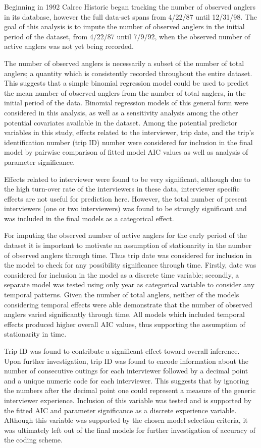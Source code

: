 \documentclass[12pt,]{article}
\begin{document}
Beginning in 1992 Calrec Historic began tracking the number of observed
anglers in its database, however the full data-set spans from 4/22/87
until 12/31/98. The goal of this analysis is to impute the number of
observed anglers in the initial period of the dataset, from 4/22/87
until 7/9/92, when the observed number of active anglers was not yet
being recorded.

The number of observed anglers is necessarily a subset of the number of
total anglers; a quantity which is consistently recorded throughout the
entire dataset. This suggests that a simple binomial regression model
could be used to predict the mean number of observed anglers from the
number of total anglers, in the initial period of the data. Binomial
regression models of this general form were considered in this analysis,
as well as a sensitivity analysis among the other potential covariates
available in the dataset. Among the potential predictor variables in
this study, effects related to the interviewer, trip date, and the
trip's identification number (trip ID) number were considered for
inclusion in the final model by pairwise comparison of fitted model AIC
values as well as analysis of parameter significance.

Effects related to interviewer were found to be very significant,
although due to the high turn-over rate of the interviewers in these
data, interviewer specific effects are not useful for prediction here.
However, the total number of present interviewers (one or two
interviewers) was found to be strongly significant and was included in
the final models as a categorical effect.

For imputing the observed number of active anglers for the early period
of the dataset it is important to motivate an assumption of stationarity
in the number of observed anglers through time. Thus trip date was
considered for inclusion in the model to check for any possibility
significance through time. Firstly, date was considered for inclusion in
the model as a discrete time variable; secondly, a separate model was
tested using only year as categorical variable to consider any temporal
patterns. Given the number of total anglers, neither of the models
considering temporal effects were able demonstrate that the number of
observed anglers varied significantly through time. All models which
included temporal effects produced higher overall AIC values, thus
supporting the assumption of stationarity in time.

Trip ID was found to contribute a significant effect toward overall
inference. Upon further investigation, trip ID was found to encode
information about the number of consecutive outings for each interviewer
followed by a decimal point and a unique numeric code for each
interviewer. This suggests that by ignoring the numbers after the
decimal point one could represent a measure of the generic interviewer
experience. Inclusion of this variable was tested and is supported by
the fitted AIC and parameter significance as a discrete experience
variable. Although this variable was supported by the chosen model
selection criteria, it was ultimately left out of the final models for
further investigation of accuracy of the coding scheme.
\end{document}
